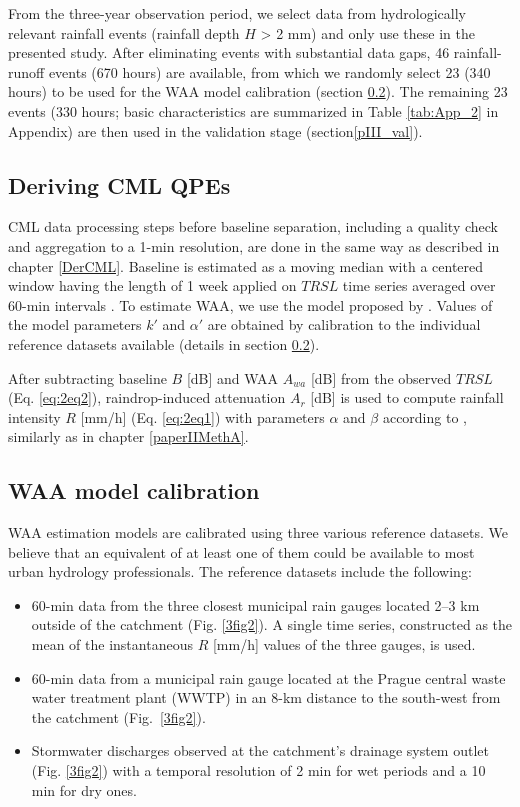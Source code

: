 \documentclass{ctuthesis}\usepackage[]{graphicx}\usepackage[]{color}
\begin{document}
From the three-year observation period, we select data from hydrologically relevant rainfall events (rainfall depth $H$ > 2 mm) and only use these in the presented study. After eliminating events with substantial data gaps, 46 rainfall-runoff events (670 hours) are available, from which we randomly select 23 (340 hours) to be used for the WAA model calibration (section \ref{pIII_cal}). The remaining 23 events (330 hours; basic characteristics are summarized in Table \ref{tab:App_2} in Appendix) are then used in the validation stage (section\ref{pIII_val}).


\subsection{Deriving CML QPEs} \label{pIII_derivQPEs}
CML data processing steps before baseline separation, including a quality check and aggregation to a 1-min resolution, are done in the same way as described in chapter \ref{DerCML}. Baseline is estimated as a moving median with a centered window having the length of 1 week applied on $T\!R\!S\!L$  time series averaged over 60-min intervals \citep{fenclAtmosphericObservationsEband2020}. To estimate WAA, we use the model proposed by \cite[][see Eq. \ref{eq:II_1}]{valtrExcessAttenuationCaused2019}. Values of the model parameters $k'$ and $\alpha'$ are obtained by calibration to the individual reference datasets available (details in section \ref{pIII_cal}). 

After subtracting baseline $B$ [dB] and WAA $A_{wa}$ [dB] from the observed $T\!R\!S\!L$ (Eq. \ref{eq:2eq2}), raindrop-induced attenuation $A_r$ [dB] is used to compute rainfall intensity $R$ [mm/h] (Eq. \ref{eq:2eq1}) with parameters $\alpha$ and $\beta$ according to \cite{recommendation2005838}, similarly as in chapter \ref{paperIIMethA}.


\subsection{WAA model calibration} \label{pIII_cal}
WAA estimation models are calibrated using three various reference datasets. We believe that an equivalent of at least one of them could be available to most urban hydrology professionals. The reference datasets include the following:
\begin{itemize}
        \item 60-min data from the three closest municipal rain gauges located 2--3 km outside of the catchment (Fig. \ref{3fig2}). A single time series, constructed as the mean of the instantaneous $R$ [mm/h] values of the three gauges, is used.
        \item 60-min data from a municipal rain gauge located at the Prague central waste water treatment plant (WWTP) in an 8-km distance to the south-west from the catchment (Fig.~\ref{3fig2}).
        \item Stormwater discharges observed at the catchment's drainage system outlet (Fig. \ref{3fig2}) with a temporal resolution of 2 min for wet periods and a 10 min for dry ones.
\end{itemize}
\end{document}
